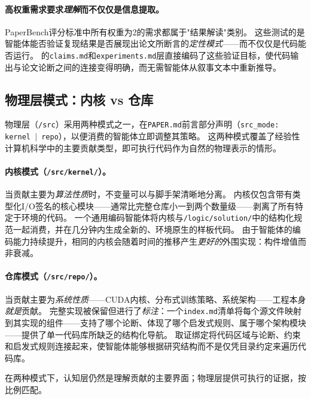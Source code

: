 \paragraph{高权重需求要求\emph{理解}而不仅仅是信息提取。}
PaperBench评分标准中所有权重为2的需求都属于"结果解读"类别。
这些测试的是智能体能否验证复现结果是否展现出论文所断言的\emph{定性模式}——而不仅仅是代码能否运行。
\ara{}的\texttt{claims.md}和\texttt{experiments.md}层直接编码了这些验证目标，使代码输出与论文论断之间的连接变得明确，而无需智能体从叙事文本中重新推导。

\subsection{物理层模式：内核 vs 仓库}
\label{sec-src-modes}

物理层（\texttt{/src}）采用两种模式之一，在\texttt{PAPER.md}前言部分声明（\texttt{src\_mode: kernel\,$|$\,repo}），以便消费的智能体立即调整其策略。
这两种模式覆盖了经验性计算机科学中的主要贡献类型，即可执行代码作为自然的物理表示的情形。

\paragraph{内核模式（\texttt{/src/kernel/}）。}
当贡献主要为\emph{算法性质}时，不变量可以与脚手架清晰地分离。
内核仅包含带有类型化I/O签名的核心模块——通常比完整仓库小一到两个数量级——剥离了所有特定于环境的代码。
一个通用编码智能体将内核与\texttt{/logic/solution/}中的结构化规范一起消费，并在几分钟内生成全新的、环境原生的样板代码。
由于智能体的编码能力持续提升，相同的内核会随着时间的推移产生\emph{更好的}外围实现：构件增值而非衰减。

\paragraph{仓库模式（\texttt{/src/repo/}）。}
当贡献主要为\emph{系统性质}——CUDA内核、分布式训练策略、系统架构——工程本身\emph{就是}贡献。
完整实现被保留但进行了\emph{标注}：一个\texttt{index.md}清单将每个源文件映射到其实现的\ara{}组件——支持了哪个论断、体现了哪个启发式规则、属于哪个架构模块——提供了单一代码库所缺乏的结构化导航。
取证绑定将代码区域与论断、约束和启发式规则连接起来，使智能体能够根据研究结构而不是仅凭目录约定来遍历代码库。

在两种模式下，认知层仍然是理解贡献的主要界面；物理层提供可执行的证据，按比例匹配。

